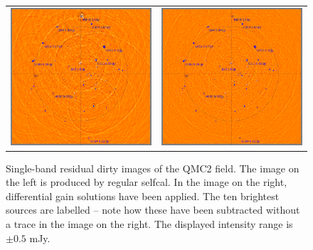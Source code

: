 \documentclass{aps2010} \special{papersize=8.5in,11in}
\begin{document}
\begin{figure}
\begin{tabular}{@{}cc@{}}
\includegraphics[width=8cm]{figures-meqtrees/qmc2-band6selfcal} &
\includegraphics[width=8cm]{figures-meqtrees/qmc2-band6de} \end{tabular}
\caption{\label{fig:qmc2}Single-band residual dirty images of the QMC2 field. The image on the left is produced by regular selfcal. In the image on the right, differential gain solutions have been applied. The ten brightest sources are labelled -- note how these have been subtracted without a trace in the image on the right. The displayed intensity range is $\pm0.5$ mJy.}
\end{figure}
\end{document}
